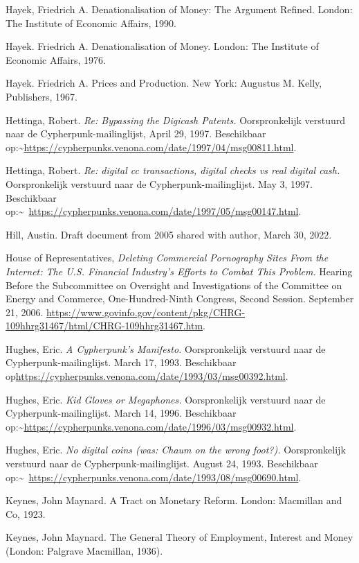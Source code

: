 \documentclass[smalldemyvopaper,11pt,twoside,onecolumn,openright,extrafontsizes,hidelinks]{memoir}
\begin{document}
Hayek, Friedrich A. Denationalisation of Money: The Argument Refined.
London: The Institute of Economic Affairs, 1990.

Hayek. Friedrich A. Denationalisation of Money. London: The Institute of
Economic Affairs, 1976.

Hayek. Friedrich A. Prices and Production. New York: Augustus M. Kelly,
Publishers, 1967.

Hettinga, Robert. \emph{Re: Bypassing the Digicash Patents.}
Oorspronkelijk verstuurd naar de Cypherpunk-mailinglijst, April 29,
1997. Beschikbaar
op:\textasciitilde{}\url{https://cypherpunks.venona.com/date/1997/04/msg00811.html}.

Hettinga, Robert. \emph{Re: digital cc transactions, digital checks vs
real digital cash.} Oorspronkelijk verstuurd naar de
Cypherpunk-mailinglijst. May 3, 1997. Beschikbaar
op:\textasciitilde~\url{https://cypherpunks.venona.com/date/1997/05/msg00147.html}.

Hill, Austin. Draft document from 2005 shared with author, March 30,
2022.

House of Representatives, \emph{Deleting Commercial Pornography Sites
From the Internet: The U.S. Financial Industry's Efforts to Combat This
Problem.} Hearing Before the Subcommittee on Oversight and
Investigations of the Committee on Energy and Commerce,
One-Hundred-Ninth Congress, Second Session. September 21, 2006.
\url{https://www.govinfo.gov/content/pkg/CHRG-109hhrg31467/html/CHRG-109hhrg31467.htm}.

Hughes, Eric. \emph{A Cypherpunk's Manifesto.} Oorspronkelijk verstuurd
naar de Cypherpunk-mailinglijst. March 17, 1993. Beschikbaar
op\url{https://cypherpunks.venona.com/date/1993/03/msg00392.html}.

Hughes, Eric. \emph{Kid Gloves or Megaphones.} Oorspronkelijk verstuurd
naar de Cypherpunk-mailinglijst. March 14, 1996. Beschikbaar
op:\textasciitilde{}\url{https://cypherpunks.venona.com/date/1996/03/msg00932.html}.

Hughes, Eric. \emph{No digital coins (was: Chaum on the wrong foot?).}
Oorspronkelijk verstuurd naar de Cypherpunk-mailinglijst. August 24,
1993. Beschikbaar
op:\textasciitilde~\url{https://cypherpunks.venona.com/date/1993/08/msg00690.html}.

Keynes, John Maynard. A Tract on Monetary Reform. London: Macmillan and
Co, 1923.

Keynes, John Maynard. The General Theory of Employment, Interest and
Money (London: Palgrave Macmillan, 1936).
\end{document}
